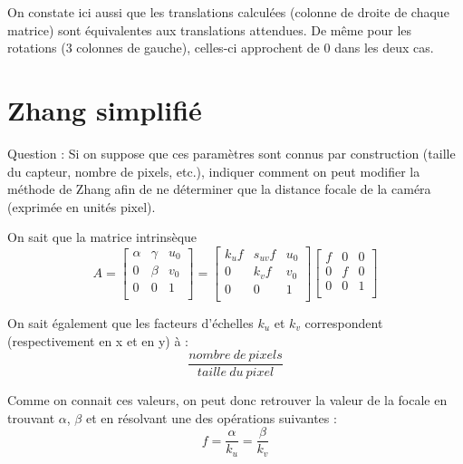 \documentclass[a4paper]{article}
\begin{document}
On constate ici aussi que les translations calculées (colonne de droite de chaque matrice) sont équivalentes aux translations attendues.
De même pour les rotations (3 colonnes de gauche), celles-ci approchent de 0 dans les deux cas.

\clearpage

\section{Zhang simplifié}

Question :
Si on suppose que ces paramètres sont connus par construction (taille du capteur, nombre de pixels, etc.), indiquer comment on peut modifier la méthode de Zhang afin de ne déterminer que la distance focale de la caméra (exprimée en unités pixel).

On sait que la matrice intrinsèque
\begin{equation}
  A=
  \begin{bmatrix}
   \alpha & \gamma & u_0 \\
   0 & \beta & v_0 \\
   0 & 0 & 1 \\
  \end{bmatrix}
  =
  \begin{bmatrix}
   k_uf & s_{uv}f & u_0 \\
   0 & k_vf & v_0 \\
   0 & 0 & 1 \\
  \end{bmatrix}
  \begin{bmatrix}
   f & 0 & 0 \\
   0 & f & 0 \\
   0 & 0 & 1 \\
  \end{bmatrix}
\end{equation}

On sait également que les facteurs d'échelles $k_u$ et $k_v$ correspondent (respectivement en x et en y) à :
\begin{equation}\frac{nombre\ de\ pixels}{taille\ du\ pixel}\end{equation}

Comme on connait ces valeurs, on peut donc retrouver la valeur de la focale en trouvant $\alpha$, $\beta$ et en résolvant une des opérations suivantes :
\begin{equation}f=\frac{\alpha}{k_u}=\frac{\beta}{k_v}\end{equation}
\end{document}
